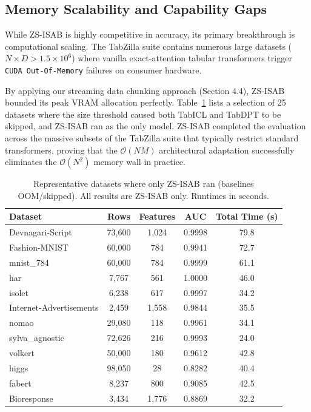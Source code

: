 \documentclass[10pt]{article}
\begin{document}
\subsection{Memory Scalability and Capability Gaps}

While ZS-ISAB is highly competitive in accuracy, its primary breakthrough is computational scaling. The TabZilla suite contains numerous large datasets ($N \times D > 1.5 \times 10^6$) where vanilla exact-attention tabular transformers trigger \texttt{CUDA Out-Of-Memory} failures on consumer hardware. 

By applying our streaming data chunking approach (Section 4.4), ZS-ISAB bounded its peak VRAM allocation perfectly. Table~\ref{tab:oom_datasets} lists a selection of 25 datasets where the size threshold caused both TabICL and TabDPT to be skipped, and ZS-ISAB ran as the only model. ZS-ISAB completed the evaluation across the massive subsets of the TabZilla suite that typically restrict standard transformers, proving that the $\mathcal{O}(NM)$ architectural adaptation successfully eliminates the $\mathcal{O}(N^2)$ memory wall in practice.

\begin{table}[htbp]
\centering
\caption{Representative datasets where only ZS-ISAB ran (baselines OOM/skipped). All results are ZS-ISAB only. Runtimes in seconds.}
\label{tab:oom_datasets}
\small
\begin{tabular}{@{}lcccc@{}}
\toprule
\textbf{Dataset} & \textbf{Rows} & \textbf{Features} & \textbf{AUC} & \textbf{Total Time (s)} \\
\midrule
Devnagari-Script  & 73,600 & 1,024 & 0.9998 & 79.8 \\
Fashion-MNIST     & 60,000 & 784   & 0.9941 & 72.7 \\
mnist\_784        & 60,000 & 784   & 0.9999 & 61.1 \\
har               & 7,767  & 561   & 1.0000 & 46.0 \\
isolet            & 6,238  & 617   & 0.9997 & 34.2 \\
Internet-Advertisements & 2,459 & 1,558 & 0.9844 & 35.5 \\
nomao             & 29,080 & 118   & 0.9961 & 34.1 \\
sylva\_agnostic   & 72,626 & 216   & 0.9993 & 24.0 \\
volkert           & 50,000 & 180   & 0.9612 & 42.8 \\
higgs             & 98,050 & 28    & 0.8282 & 40.4 \\
fabert            & 8,237  & 800   & 0.9085 & 42.5 \\
Bioresponse       & 3,434  & 1,776 & 0.8869 & 32.2 \\
\bottomrule
\end{tabular}
\end{table}
\end{document}
